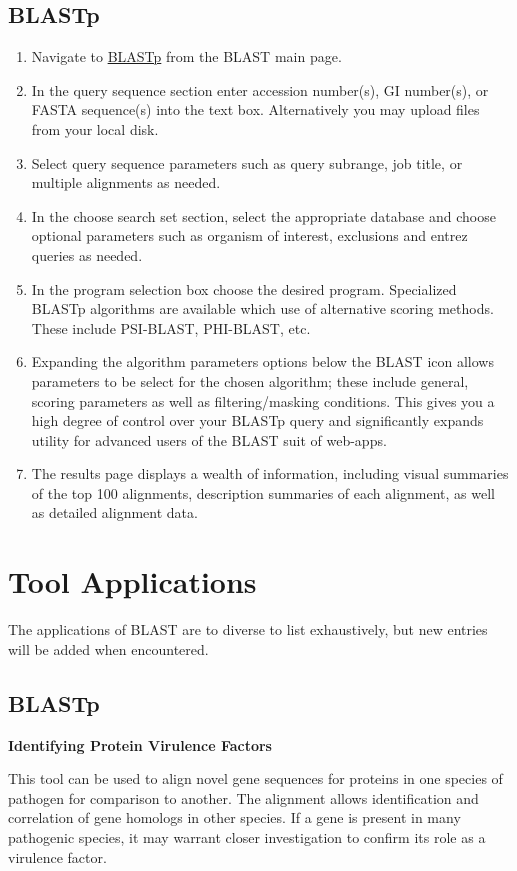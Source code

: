     \subsection{BLASTp}
    \begin{enumerate}
        \item Navigate to \href{https://blast.ncbi.nlm.nih.gov/Blast.cgi?PROGRAM=blastp&PAGE_TYPE=BlastSearch&LINK_LOC=blasthome}{BLASTp} from the BLAST main page.
        \item In the query sequence section enter accession number(s), GI number(s), or FASTA sequence(s) into the text box. Alternatively you may upload files from your local disk.
        \item Select query sequence parameters such as query subrange, job title, or multiple alignments as needed.
        \item In the choose search set section, select the appropriate database and choose optional parameters such as organism of interest, exclusions and entrez queries as needed.
        \item In the program selection box choose the desired program. Specialized BLASTp algorithms are available which use of alternative scoring methods. These include PSI-BLAST, PHI-BLAST, etc.
        \item Expanding the algorithm parameters options below the BLAST icon allows parameters to be select for the chosen algorithm; these include general, scoring parameters as well as filtering/masking conditions. This gives you a high degree of control over your BLASTp query and significantly expands utility for advanced users of the BLAST suit of web-apps.
        \item The results page displays a wealth of information, including visual summaries of the top 100 alignments, description summaries of each alignment, as well as detailed alignment data.
    \end{enumerate}
\section{Tool Applications}

The applications of BLAST are to diverse to list exhaustively, but new entries will be added when encountered.

    \subsection{BLASTp}

    \textbf{Identifying Protein Virulence Factors}

    This tool can be used to align novel gene sequences for proteins in one species of pathogen for comparison to another. The alignment allows identification and correlation of gene homologs in other species. If a gene is present in many pathogenic species, it may warrant closer investigation to confirm its role as a virulence factor.\autocite{L1}


